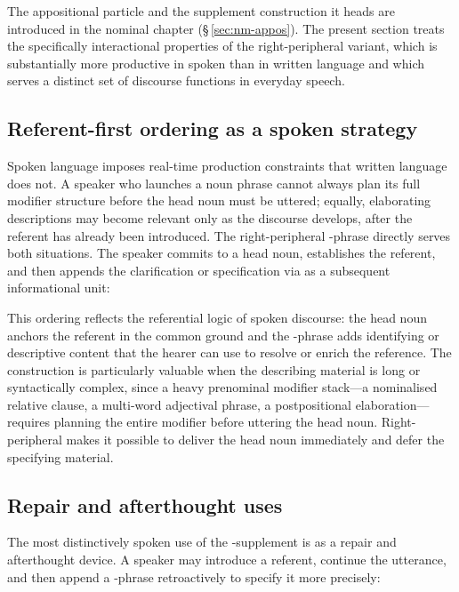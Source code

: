 The appositional particle  and the supplement construction it heads
are introduced in the nominal chapter (\S\,\ref{sec:nm-appos}). The present
section treats the specifically interactional properties of the
right-peripheral variant, which is substantially more productive in spoken
than in written language and which serves a distinct set of discourse functions
in everyday speech.

\subsection{Referent-first ordering as a spoken strategy}
\label{sec:spoken-ty-strategy}

Spoken language imposes real-time production constraints that written language
does not. A speaker who launches a noun phrase cannot always plan its full
modifier structure before the head noun must be uttered; equally, elaborating
descriptions may become relevant only as the discourse develops, after the
referent has already been introduced. The right-peripheral -phrase
directly serves both situations. The speaker commits to a head noun,
establishes the referent, and then appends the clarification or specification
via  as a subsequent informational unit:

\pex
\a {}
\a {}
\a {}
\xe

\noindent This ordering reflects the referential logic of spoken discourse: the
head noun anchors the referent in the common ground and the -phrase
adds identifying or descriptive content that the hearer can use to resolve or
enrich the reference. The construction is particularly valuable when the
describing material is long or syntactically complex, since a heavy prenominal
modifier stack---a nominalised relative clause, a multi-word adjectival phrase,
a postpositional elaboration---requires planning the entire modifier before
uttering the head noun. Right-peripheral  makes it possible to deliver
the head noun immediately and defer the specifying material.

\subsection{Repair and afterthought uses}
\label{sec:spoken-ty-repair}

The most distinctively spoken use of the -supplement is as a repair
and afterthought device. A speaker may introduce a referent, continue the
utterance, and then append a -phrase retroactively to specify it more
precisely:

